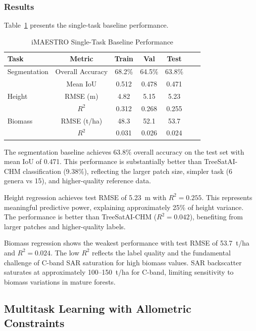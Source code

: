 \subsubsection{Results}

Table~\ref{tab:imaestro_baselines} presents the single-task baseline performance.

\begin{table}[htbp]
\centering
\caption{iMAESTRO Single-Task Baseline Performance}
\label{tab:imaestro_baselines}
\begin{tabular}{lcccccc}
\hline
\textbf{Task} & \textbf{Metric} & \textbf{Train} & \textbf{Val} & \textbf{Test} \\
\hline
Segmentation & Overall Accuracy & 68.2\% & 64.5\% & 63.8\% \\
             & Mean IoU & 0.512 & 0.478 & 0.471 \\
Height       & RMSE (m) & 4.82 & 5.15 & 5.23 \\
             & $R^2$ & 0.312 & 0.268 & 0.255 \\
Biomass      & RMSE (t/ha) & 48.3 & 52.1 & 53.7 \\
             & $R^2$ & 0.031 & 0.026 & 0.024 \\
\hline
\end{tabular}
\end{table}

The segmentation baseline achieves 63.8\% overall accuracy on the test set with mean IoU of 0.471. This performance is substantially better than TreeSatAI-CHM classification (9.38\%), reflecting the larger patch size, simpler task (6 genera vs 15), and higher-quality reference data.

Height regression achieves test RMSE of 5.23~m with $R^2 = 0.255$. This represents meaningful predictive power, explaining approximately 25\% of height variance. The performance is better than TreeSatAI-CHM ($R^2 = 0.042$), benefiting from larger patches and higher-quality labels.

Biomass regression shows the weakest performance with test RMSE of 53.7~t/ha and $R^2 = 0.024$. The low $R^2$ reflects the label quality and the fundamental challenge of C-band SAR saturation for high biomass values. SAR backscatter saturates at approximately 100--150~t/ha for C-band, limiting sensitivity to biomass variations in mature forests.

\subsection{Multitask Learning with Allometric Constraints}

